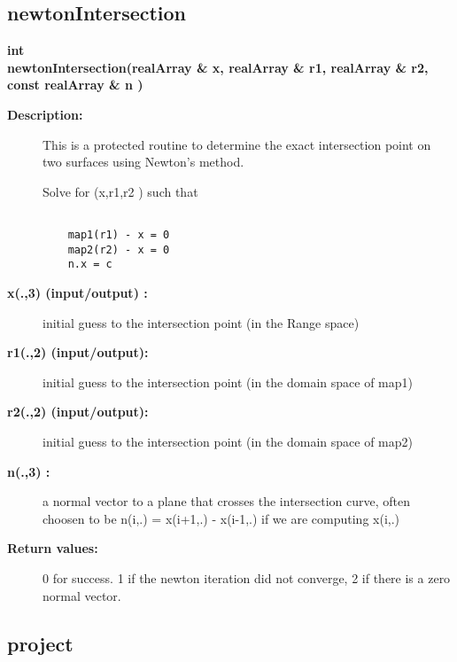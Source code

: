 \subsection{newtonIntersection}
 
\begin{flushleft} \textbf{%
int  \\ 
\settowidth{\IntersectionMappingIncludeArgIndent}{newtonIntersection(}%
newtonIntersection(realArray \& x, realArray \& r1, realArray \& r2, const realArray \& n )
}\end{flushleft}
\begin{description}
\item[{\bf Description:}]  
   This is a protected routine to determine the exact intersection point on two surfaces using Newton's
  method.

 Solve for (x,r1,r2 ) such that 
 \begin{verbatim}

    map1(r1) - x = 0
    map2(r2) - x = 0
    n.x = c
 \end{verbatim}

\item[{\bf x(.,3) (input/output) :}]  initial guess to the intersection point (in the Range space)
\item[{\bf r1(.,2) (input/output):}]  initial guess to the intersection point (in the domain space of map1)
\item[{\bf r2(.,2) (input/output):}]  initial guess to the intersection point (in the domain space of map2)
\item[{\bf n(.,3) :}]  a normal vector to a plane that crosses the intersection curve, often choosen
         to be  n(i,.) = x(i+1,.) - x(i-1,.) if we are computing x(i,.)
\item[{\bf Return values:}]  0 for success. 1 if the newton iteration did not converge, 2 if there is a
 zero normal vector.
\end{description}
\subsection{project}
 
